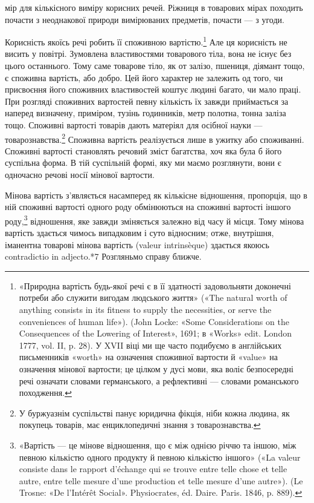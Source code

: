 \parcont{}  %
мір для кількісного виміру корисних речей. Ріжниця в товарових
мірах походить почасти з неоднакової природи вимірюваних
предметів, почасти — з угоди.

Корисність якоїсь речі робить її споживною вартістю.\footnote{
«Природна вартість будь-якої речі є в її здатності задовольняти
доконечні потреби або служити вигодам людського життя» («The natural
worth of anything consists in its fitness to supply the necessities, or serve
the conveniences of human life»). (John Locke: «Some Considerations
on the Consequences of the Lowering of Interest», 1691; в «Works» edit.
London 1777, vol. II, p. 28). У XVII віці ми ще часто подибуємо в англійських
письменників «worth» на означення споживної вартости й
«value» на означення мінової вартости; це цілком у дусі мови, яка воліє
безпосередні речі означати словами германського, а рефлективні — словами
романського походження.
}  Але
ця корисність не висить у повітрі. Зумовлена властивостями товарового
тіла, вона не існує без цього останнього. Тому саме товарове
тіло, як от залізо, пшениця, діямант тощо, є споживна
вартість, або добро. Цей його характер не залежить од того, чи
присвоєння його споживних властивостей коштує людині багато,
чи мало праці. При розгляді споживних вартостей певну кількість
їх завжди приймається за наперед визначену, приміром,
тузінь годинників, метр полотна, тонна заліза тощо. Споживні
вартості товарів дають матеріял для осібної науки — товарознавства.\footnote{
У буржуазнім суспільстві панує юридична фікція, ніби кожна людина,
як покупець товарів, має енциклопедичні знання з товарознавства.
}
Споживна вартість реалізується лише в ужитку або споживанні.
Споживні вартості становлять речовий зміст багатства, хоч
яка була б його суспільна форма. В тій суспільній формі, яку ми
маємо розглянути, вони є одночасно речові носії мінової вартости.

Мінова вартість з’являється насамперед як кількісне відношення,
пропорція, що в ній споживні вартості одного роду обмінюються
на споживні вартості іншого роду,\footnote{
«Вартість — це мінове відношення, що є між однією річчю та іншою,
між певною кількістю одного продукту й певною кількістю іншого»
(«La valeur consiste dans le rapport d’échange qui se trouve entre telle
chose et telle autre, entre telle mesure d’une production et telle mesure
d’une autre»). (Le Trosne: «De l’Intérêt Social». Physiocrates, éd. Daire.
Paris. 1846, p. 889).
} відношення, яке
завжди зміняється залежно від часу й місця. Тому мінова вартість
здається чимось випадковим і суто відносним; отже, внутрішня,
іманентна товарові мінова вартість (valeur intrinsèque) здається
якоюсь contradictio in adjecto.*7 Розгляньмо справу ближче.

